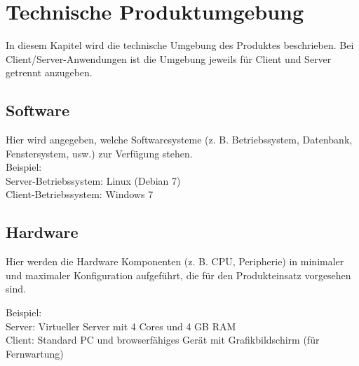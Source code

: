 

\chapter{Technische Produktumgebung}
\label{chap:tech_env}

In diesem Kapitel wird die technische Umgebung des Produktes beschrieben. Bei
Client/Server-Anwendungen ist die Umgebung jeweils für Client und Server
getrennt anzugeben.

\section{Software}
Hier wird angegeben, welche Softwaresysteme (z. B. Betriebssystem, Datenbank,
Fenstersystem, usw.) zur Verfügung stehen.\\

Beispiel:\\
Server-Betriebssystem: Linux (Debian 7)\\
Client-Betriebssystem: Windows 7\\


\section{Hardware}
Hier werden die Hardware Komponenten (z. B. CPU, Peripherie) in minimaler und
maximaler Konfiguration aufgeführt, die für den Produkteinsatz vorgesehen
sind.

Beispiel:\\
Server: Virtueller Server mit 4 Cores und 4 GB RAM \\
Client: Standard PC und browserfähiges Gerät mit Grafikbildschirm (für Fernwartung)\\
